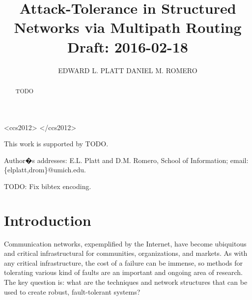 \documentclass[prodmode,permissions]{acmsmall-ec16}
\begin{document}

\title{
Attack-Tolerance in Structured Networks via Multipath Routing
\\ Draft: 2016-02-18
}
\author{EDWARD L. PLATT
DANIEL M. ROMERO
}

\begin{abstract}
TODO
\end{abstract}


\begin{CCSXML}
<ccs2012>
</ccs2012>  
\end{CCSXML}




\begin{bottomstuff}
This work is supported by TODO.

Author�s addresses: E.L. Platt and D.M. Romero, School of Information; email: \{elplatt,drom\}@umich.edu.
\end{bottomstuff}

\maketitle

TODO: Fix bibtex encoding. 

\section{Introduction}

Communication networks, expemplified by the Internet,
have become ubiquitous and critical infrastructural for
communities, organizations, and markets.
As with any critical infrastructure, the cost of a failure can be
immense, so methods for tolerating various kind of faults are an
important and ongoing area of research.
The key question is: what are the techniques and network structures that can
be used to create robust, fault-tolerant systems?
\end{document}
